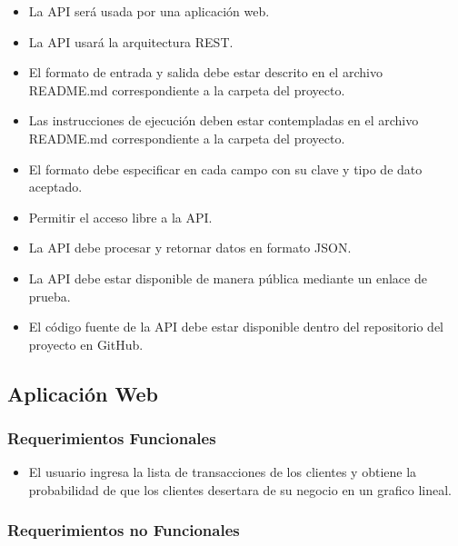\begin{itemize}
	\item La API será usada por una aplicación web.
	\item La API usará la arquitectura REST.
	\item El formato de entrada y salida debe estar descrito en el archivo README.md correspondiente a la carpeta del proyecto.
	\item Las instrucciones de ejecución deben estar contempladas en el archivo README.md correspondiente a la carpeta del proyecto.
	\item El formato debe especificar en cada campo con su clave y tipo de dato aceptado.
	\item Permitir el acceso libre a la API.
	\item La API debe procesar y retornar datos en formato JSON.
	\item La API debe estar disponible de manera pública mediante un enlace de prueba.
	\item El código fuente de la API debe estar disponible dentro del repositorio del proyecto en GitHub.
\end{itemize}

\subsection{Aplicación Web}

\subsubsection{Requerimientos Funcionales}

\begin{itemize}
	\item El usuario ingresa la lista de transacciones de los clientes y obtiene la probabilidad de que los clientes desertara de su negocio en un grafico lineal.
\end{itemize}

\subsubsection{Requerimientos no Funcionales}

